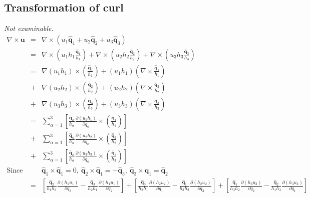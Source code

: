 \documentclass[11pt,a4paper]{article}
\begin{document}
\subsection{Transformation of curl}

\textit{Not examinable.}
\[\begin{array}{rcll}
\nabla\times\textbf{u}&=&\nabla\times(u_1\hat{\textbf{q}}_1+u_2\hat{\textbf{q}}_2+u_3\hat{\textbf{q}}_3)\\
&=&\nabla\times\left(u_1h_1\frac{\hat{\textbf{q}}_1}{h_1}\right)+\nabla\times\left(u_2h_2\frac{\hat{\textbf{q}}_2}{h_2}\right)+\nabla\times\left(u_3h_3\frac{\hat{\textbf{q}}_3}{h_3}\right)\\
&=&\nabla(u_1h_1)\times\left(\frac{\hat{\textbf{q}}_1}{h_1}\right)+(u_1h_1)\left(\nabla\times\frac{\hat{\textbf{q}}_1}{h_1}\right)\\
&+&\nabla(u_2h_2)\times\left(\frac{\hat{\textbf{q}}_2}{h_2}\right)+(u_2h_2)\left(\nabla\times\frac{\hat{\textbf{q}}_2}{h_2}\right)\\
&+&\nabla(u_3h_3)\times\left(\frac{\hat{\textbf{q}}_3}{h_3}\right)+(u_3h_3)\left(\nabla\times\frac{\hat{\textbf{q}}_3}{h_3}\right)\\
&=&\sum_{\alpha=1}^3\left[\frac{\hat{\textbf{q}}_\alpha}{h_\alpha}\frac{\partial (u_1h_1)}{\partial q_\alpha}\times\left(\frac{\hat{\textbf{q}}_1}{h_1}\right)\right]\\
&+&\sum_{\alpha=1}^3\left[\frac{\hat{\textbf{q}}_\alpha}{h_\alpha}\frac{\partial (u_2h_2)}{\partial q_\alpha}\times\left(\frac{\hat{\textbf{q}}_2}{h_2}\right)\right]\\
&+&\sum_{\alpha=1}^3\left[\frac{\hat{\textbf{q}}_\alpha}{h_\alpha}\frac{\partial (u_3h_3)}{\partial q_\alpha}\times\left(\frac{\hat{\textbf{q}}_3}{h_3}\right)\right]\\
\mathrm{Since}&&\hat{\textbf{q}}_1\times\hat{\textbf{q}}_1=0,\ \hat{\textbf{q}}_2\times\hat{\textbf{q}}_1=-\hat{\textbf{q}}_3,\ \hat{\textbf{q}}_3\times\hat{\textbf{q}}_1=\hat{\textbf{q}}_2\\
&=&\left[\frac{\hat{\textbf{q}}_2}{h_1h_3}\frac{\partial(h_1u_1)}{\partial q_3}-\frac{\hat{\textbf{q}}_3}{h_2h_1}\frac{\partial(h_1u_1)}{\partial q_2}\right]
+\left[\frac{\hat{\textbf{q}}_3}{h_2h_1}\frac{\partial(h_2u_2)}{\partial q_1}-\frac{\hat{\textbf{q}}_1}{h_3h_2}\frac{\partial(h_2u_2)}{\partial q_3}\right]
+\left[\frac{\hat{\textbf{q}}_1}{h_3h_2}\frac{\partial(h_3u_3)}{\partial q_2}-\frac{\hat{\textbf{q}}_2}{h_1h_3}\frac{\partial(h_3u_3)}{\partial q_1}\right]\\

\end{array}\]
\end{document}
